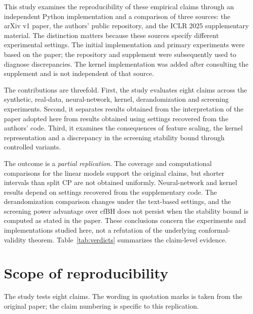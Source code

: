 This study examines the reproducibility of these empirical claims through an independent Python implementation and a comparison of three sources: the arXiv v1 paper, the authors' public repository, and the ICLR 2025 supplementary material. The distinction matters because these sources specify different experimental settings. The initial implementation and primary experiments were based on the paper; the repository and supplement were subsequently used to diagnose discrepancies. The kernel implementation was added after consulting the supplement and is not independent of that source.

The contributions are threefold. First, the study evaluates eight claims across the synthetic, real-data, neural-network, kernel, derandomization and screening experiments. Second, it separates results obtained from the interpretation of the paper adopted here from results obtained using settings recovered from the authors' code. Third, it examines the consequences of feature scaling, the kernel representation and a discrepancy in the screening stability bound through controlled variants.

The outcome is a \emph{partial replication}. The coverage and computational comparisons for the linear models support the original claims, but shorter intervals than split CP are not obtained uniformly. Neural-network and kernel results depend on settings recovered from the supplementary code. The derandomization comparison changes under the text-based settings, and the screening power advantage over cfBH does not persist when the stability bound is computed as stated in the paper. These conclusions concern the experiments and implementations studied here, not a refutation of the underlying conformal-validity theorem. Table~\ref{tab:verdicts} summarizes the claim-level evidence.

\section{Scope of reproducibility}
\label{sec:scope}

The study tests eight claims. The wording in quotation marks is taken from the original paper; the claim numbering is specific to this replication.

